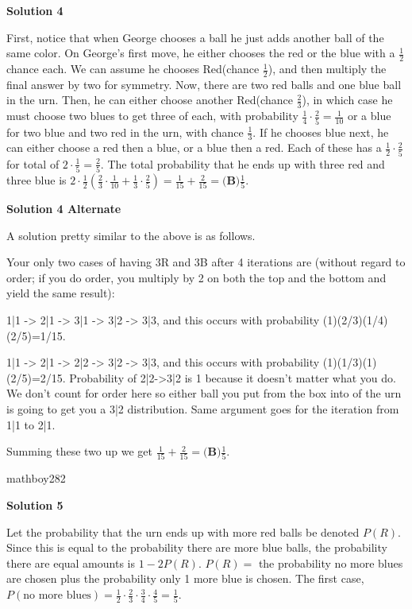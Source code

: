 \begin{enumerate}
\textbf{Solution 4}

First, notice that when George chooses a ball he just adds another ball of the same color. On George's first move, he either chooses the red or the blue with a $\frac{1}{2}$ chance each. We can assume he chooses Red(chance $\frac{1}{2}$), and then multiply the final answer by two for symmetry. Now, there are two red balls and one blue ball in the urn. Then, he can either choose another Red(chance $\frac{2}{3}$), in which case he must choose two blues to get three of each, with probability $\frac{1}{4}\cdot\frac{2}{5}=\frac{1}{10}$ or a blue for two blue and two red in the urn, with chance $\frac{1}{3}$. If he chooses blue next, he can either choose a red then a blue, or a blue then a red. Each of these has a $\frac{1}{2}\cdot\frac{2}{5}$ for total of $2\cdot\frac{1}{5}=\frac{2}{5}$. The total probability that he ends up with three red and three blue is $2\cdot\frac{1}{2}(\frac{2}{3}\cdot\frac{1}{10}+\frac{1}{3}\cdot\frac{2}{5})=\frac{1}{15}+\frac{2}{15}=\boxed{\textbf{(B)} \frac{1}{5}}$.

 



\textbf{Solution 4 Alternate}

A solution pretty similar to the above is as follows.

 Your only two cases of having 3R and 3B after 4 iterations are (without regard to order; if you do order, you multiply by 2 on both the top and the bottom and yield the same result):

 1|1 -> 2|1 -> 3|1 -> 3|2 -> 3|3, and this occurs with probability (1)(2/3)(1/4)(2/5)=1/15.

 1|1 -> 2|1 -> 2|2 -> 3|2 -> 3|3, and this occurs with probability (1)(1/3)(1)(2/5)=2/15. Probability of 2|2->3|2 is 1 because it doesn't matter what you do. We don't count for order here so either ball you put from the box into of the urn is going to get you a 3|2 distribution. Same argument goes for the iteration from 1|1 to 2|1.

 Summing these two up we get $\frac{1}{15}+\frac{2}{15}=\boxed{\textbf{(B)} \frac{1}{5}}.$

 mathboy282

 



\textbf{Solution 5}

Let the probability that the urn ends up with more red balls be denoted $P(R)$. Since this is equal to the probability there are more blue balls, the probability there are equal amounts is $1-2P(R)$. $P(R) =$ the probability no more blues are chosen plus the probability only 1 more blue is chosen. The first case, $P(\text{no more blues}) = \frac{1}{2}\cdot\frac{2}{3}\cdot\frac{3}{4}\cdot\frac{4}{5}=\frac{1}{5}$.


\end{enumerate}
